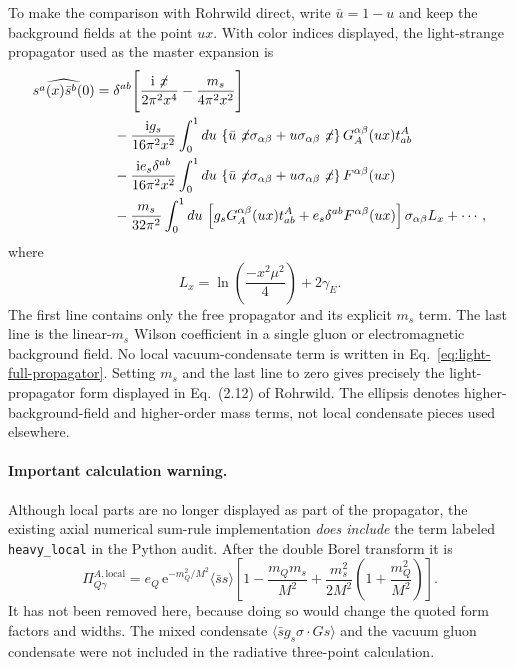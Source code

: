 \documentclass[11pt]{article}
\newcommand{\ii}{\mathrm{i}}
\newcommand{\ee}{\mathrm{e}}
\begin{document}
To make the comparison with Rohrwild direct, write $\bar u=1-u$ and keep the
background fields at the point $ux$.  With color indices displayed, the
light-strange propagator used as the master expansion is
\begin{align}
  \widehat{s^a(x)\bar s^b(0)}={}&
  \delta^{ab}\Bigg[
    \frac{\ii\not\!x}{2\pi^2x^4}
    -\frac{m_s}{4\pi^2x^2}
  \Bigg]
  \nonumber\\
  &-\frac{\ii g_s}{16\pi^2x^2}\int_0^1du\,
  \left\{\bar u\not\!x\sigma_{\alpha\beta}
  +u\sigma_{\alpha\beta}\not\!x\right\}
  G_A^{\alpha\beta}(ux)t^A_{ab}
  \nonumber\\
  &-\frac{\ii e_s\delta^{ab}}{16\pi^2x^2}\int_0^1du\,
  \left\{\bar u\not\!x\sigma_{\alpha\beta}
  +u\sigma_{\alpha\beta}\not\!x\right\}
  F^{\alpha\beta}(ux)
  \nonumber\\
  &-\frac{m_s}{32\pi^2}\int_0^1du\,
  \left[g_sG_A^{\alpha\beta}(ux)t^A_{ab}
       +e_s\delta^{ab}F^{\alpha\beta}(ux)\right]
  \sigma_{\alpha\beta}L_x+\cdots ,
  \label{eq:light-full-propagator}
\end{align}
where
\begin{equation}
  L_x=\ln\!\left(\frac{-x^2\mu^2}{4}\right)+2\gamma_E .
\end{equation}
The first line contains only the free propagator and its explicit $m_s$ term.
The last line is the linear-$m_s$ Wilson coefficient in a single gluon or
electromagnetic background field.  No local vacuum-condensate term is written
in Eq.~\eqref{eq:light-full-propagator}.  Setting $m_s$ and the last line to
zero gives precisely the light-propagator form displayed in Eq.~(2.12) of
Rohrwild.  The ellipsis denotes higher-background-field and higher-order mass
terms, not local condensate pieces used elsewhere.

\paragraph{Important calculation warning.}
Although local parts are no longer displayed as part of the propagator, the
existing axial numerical sum-rule implementation \emph{does include} the
term labeled \texttt{heavy\_local} in the Python audit.  After the double
Borel transform it is
\begin{equation}
  \Pi^{A,\mathrm{local}}_{Q\gamma}
  =e_Q\,\ee^{-m_Q^2/M^2}\langle\bar ss\rangle
  \left[
    1-\frac{m_Qm_s}{M^2}
    +\frac{m_s^2}{2M^2}\left(1+\frac{m_Q^2}{M^2}\right)
  \right].
  \label{eq:heavy-local}
\end{equation}
It has not been removed here, because doing so would change the quoted form
factors and widths.  The mixed condensate
$\langle\bar s g_s\sigma\cdot Gs\rangle$ and the vacuum gluon condensate were
not included in the radiative three-point calculation.
\end{document}
